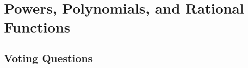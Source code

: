 \section{Powers, Polynomials, and Rational Functions} \label{S.0.6.PowersPolysRationals}


\newpage

\newpage

\newpage

\newpage

\newpage

\newpage
\subsection*{Voting Questions}

\newpage
